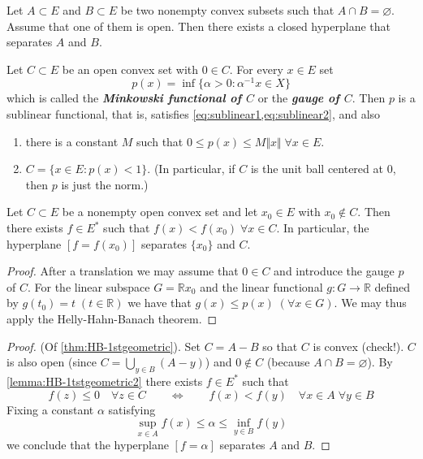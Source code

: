 \documentclass{article}
\theoremstyle{definition}
\numberwithin{equation}{section}
\newcommand{\R}{\mathbb{R}}
\begin{document}
	\begin{thm}\label{thm:HB-1stgeometric}
		Let $A\subset E$ and $B\subset E$ be two nonempty convex subsets such that $A\cap B=\varnothing$. Assume that one of them is open. Then there exists a closed hyperplane that separates $A$ and $B$.
	\end{thm}
	\begin{lemma}
		Let $C\subset E$ be an open convex set with $0\in C$. For every $x\in E$ set
		\[p(x)=\inf\{\alpha>0:\alpha^{-1}x\in X\}\]
		which is called the \textbf{\textit{Minkowski functional of $C$}} or the \textbf{\textit{gauge of $C$}}. Then $p$ is a sublinear functional, that is, satisfies \cref{eq:sublinear1,eq:sublinear2}, and also
		\begin{enumerate}
			\item there is a constant $M$ such that $0\leq p(x)\leq M\Vert x\Vert\;\forall x\in E$.
			\item $C=\{x\in E:p(x)<1\}$. (In particular, if $C$ is the unit ball centered at $0$, then $p$ is just the norm.)
		\end{enumerate}
	\end{lemma}
	\begin{lemma}\label{lemma:HB-1tstgeometric2}
		Let $C\subset E$ be a nonempty open convex set and let $x_0\in E$ with $x_0\notin C$. Then there exists $f\in E^*$ such that $f(x)<f(x_0)\;\forall x\in C$. In particular, the hyperplane $[f=f(x_0)]$ separates $\{x_0\}$ and $C$.
	\end{lemma}
	\begin{proof}
		After a translation we may assume that $0\in C$ and introduce the gauge $p$ of $C$. For the linear subspace $G=\R x_0$ and the linear functional $g:G\to\R$ defined by $g(t_0)=t\;(t\in\R)$ we have that $g(x)\leq p(x)\;(\forall x\in G)$. We may thus apply the Helly-Hahn-Banach theorem.
	\end{proof}
	\begin{proof}
		(Of \cref{thm:HB-1stgeometric}). Set $C=A-B$ so that $C$ is convex (check!). $C$ is also open (since $C=\bigcup_{y\in B}(A-y)$) and $0\notin C$ (because $A\cap B=\varnothing$). By \cref{lemma:HB-1tstgeometric2} there exists $f\in E^*$ such that
		\[f(z)\leq0\quad\forall z\in C\qquad\iff\qquad f(x)<f(y)\quad\forall x\in A\;\forall y\in B\]
		Fixing a constant $\alpha$ satisfying
		\[\sup_{x\in A}f(x)\leq \alpha\leq\inf_{y\in B}f(y)\]
		we conclude that the hyperplane $[f=\alpha]$ separates $A$ and $B$.
	\end{proof}
	
\end{document}
